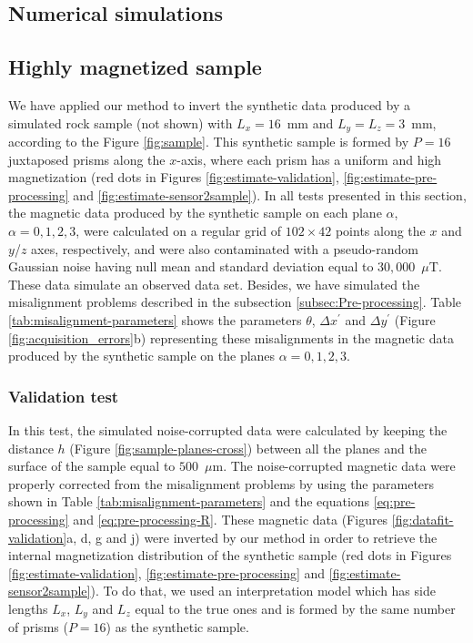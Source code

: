 \documentclass[galley,gc]{agutex}
\begin{document}
\begin{article}
\section{Numerical simulations}
\label{sec:Numerical simulations}

\subsection{Highly magnetized sample}

We have applied our method to invert the synthetic data produced
by a simulated rock sample (not shown) with $L_{x} = 16$~mm and 
$L_{y} = L_{z} = 3$~mm, according to the Figure \ref{fig:sample}.
This synthetic sample is formed by $P = 16$ juxtaposed prisms along 
the $x$-axis, where each prism has a uniform and high magnetization
(red dots in Figures \ref{fig:estimate-validation},
\ref{fig:estimate-pre-processing} and \ref{fig:estimate-sensor2sample}).
In all tests presented in this section, 
the magnetic data produced by the synthetic sample on 
each plane $\alpha$, $\alpha = 0, 1, 2, 3$, were calculated on
a regular grid of $102 \times 42$ points along the $x$ and 
$y$/$z$ axes, respectively, and were also contaminated with a 
pseudo-random Gaussian noise having null mean and standard 
deviation equal to $30,000$~$\mu$T. These data simulate
an observed data set.
Besides, we have simulated the misalignment problems 
described in the subsection \ref{subsec:Pre-processing}.
Table \ref{tab:misalignment-parameters} shows the parameters
$\theta$, $\Delta x^{\prime}$ and $\Delta y^{\prime}$ (Figure 
\ref{fig:acquisition_errors}b) representing these misalignments
in the magnetic data produced by the synthetic sample on
the planes $\alpha = 0, 1, 2, 3$.

\subsubsection{Validation test}
\label{subsec:Validation test}

In this test, the simulated noise-corrupted data were calculated 
by keeping the distance $h$ (Figure \ref{fig:sample-planes-cross}) 
between all the planes and the surface of the sample equal to 
$500$~$\mu$m.
The noise-corrupted magnetic data were properly corrected 
from the misalignment problems by using the parameters shown in 
Table \ref{tab:misalignment-parameters} and the equations 
\ref{eq:pre-processing} and \ref{eq:pre-processing-R}.
These magnetic data (Figures \ref{fig:datafit-validation}a, d, g and j)
were inverted by our method in order to retrieve the internal
magnetization distribution of the synthetic sample
(red dots in Figures \ref{fig:estimate-validation},
\ref{fig:estimate-pre-processing} and \ref{fig:estimate-sensor2sample}).
To do that, we used an interpretation model which has side lengths 
$L_{x}$, $L_{y}$ and $L_{z}$ equal to the true ones and is
formed by the same number of prisms ($P = 16$) as the synthetic sample.


\end{article}
\end{document}
